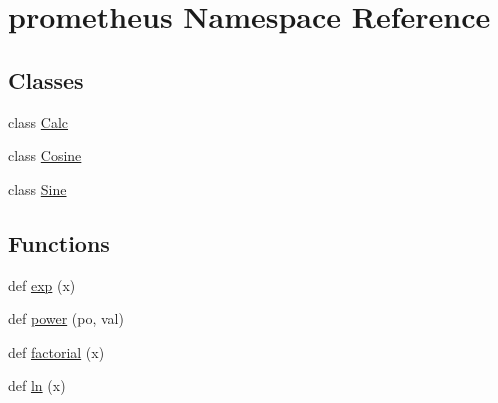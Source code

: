 \hypertarget{namespaceprometheus}{}\section{prometheus Namespace Reference}
\label{namespaceprometheus}
\subsection*{Classes}
\begin{DoxyCompactItemize}
\item 
class \hyperlink{classprometheus_1_1_calc}{Calc}
\item 
class \hyperlink{classprometheus_1_1_cosine}{Cosine}
\item 
class \hyperlink{classprometheus_1_1_sine}{Sine}
\end{DoxyCompactItemize}
\subsection*{Functions}
\begin{DoxyCompactItemize}
\item 
def \hyperlink{namespaceprometheus_a61a9e9f1f48e4187d86d4a81eda44051}{exp} (x)
\item 
def \hyperlink{namespaceprometheus_abaf3b4722895089cba4c51cd05544bfc}{power} (po, val)
\item 
def \hyperlink{namespaceprometheus_afac902e8d31b4950deda2584cd6a23e1}{factorial} (x)
\item 
def \hyperlink{namespaceprometheus_a8bfa10ff1d6fa62990f02f55b592ab29}{ln} (x)
\end{DoxyCompactItemize}
